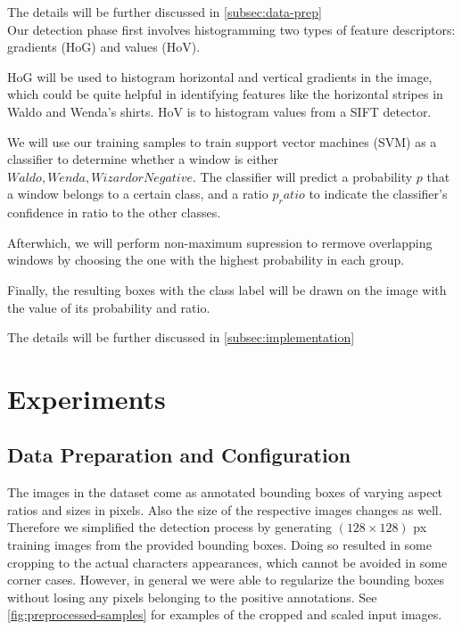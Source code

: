 \documentclass[11pt]{article}
\begin{document}
The details will be further discussed in \autoref{subsec:data-prep}\\

Our detection phase first involves histogramming two types of feature descriptors: gradients (HoG) and values (HoV).

HoG will be used to histogram horizontal and vertical gradients in the image, which could be quite helpful in identifying features like the horizontal stripes in Waldo and Wenda's shirts. HoV is to histogram values from a SIFT detector.

We will use our training samples to train support vector machines (SVM) as a classifier to determine whether a window is either \(Waldo, Wenda, Wizard or Negative\). The classifier will predict a probability \(p\) that a window belongs to a certain class, and a ratio \(p_ratio\) to indicate the classifier's confidence in ratio to the other classes.

Afterwhich, we will perform non-maximum supression to rermove overlapping windows by choosing the one with the highest probability in each group.

Finally, the resulting boxes with the class label will be drawn on the image with the value of its probability and ratio.

The details will be further discussed in \autoref{subsec:implementation}\\


\section{Experiments}
\subsection{Data Preparation and Configuration}\label{subsec:data-prep}

The images in the dataset come as annotated bounding boxes of varying aspect ratios and sizes in pixels.
Also the size of the respective images changes as well. Therefore we simplified the detection process by
generating \( (128 \times 128) \) px training images from the provided bounding boxes. 
Doing so resulted in some cropping to the actual characters appearances, which cannot be avoided in some corner cases.
However, in general we were able to regularize the bounding boxes without losing any pixels belonging to the positive annotations.
See \autoref{fig:preprocessed-samples} for examples of the cropped and scaled input images.
\end{document}
